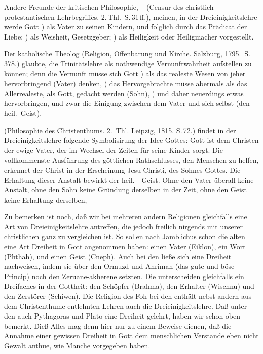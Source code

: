 \begin{aufza}
\begin{aufzb}
\item Andere Freunde der kritischen Philosophie, \zB\  (Censur des christlich-protestantischen Lehrbegriffes, 2.\,Thl.\ S.\,31\,ff.), meinen, in der Dreieinigkeitslehre werde Gott ) als Vater zu seinen Kindern, und folglich durch das Prädicat der Liebe; ) als Weisheit, Gesetzgeber; ) als Heiligkeit oder Heiligmacher vorgestellt.
\item Der katholische Theolog  (Religion, Offenbarung und Kirche. Salzburg, 1795.\ S.\,378.) glaubte, die Trinitätslehre als nothwendige Vernunftwahrheit aufstellen zu können; denn die Vernunft müsse sich Gott ) als das realeste Wesen von jeher hervorbringend (Vater) denken, ) das Hervorgebrachte müsse abermals als das Allerrealeste, als Gott, gedacht werden (Sohn), ) und daher neuerdings etwas hervorbringen, und zwar die Einigung zwischen dem Vater und sich selbst (den heil.\ Geist).
\item {} (Philosophie des Christenthums. 2.~Thl. Leipzig, 1815. S.\,72.) findet in der Dreieinigkeitslehre folgende Symbolisirung der Idee Gottes: Gott ist dem Christen der ewige Vater, der im Wechsel der Zeiten für seine Kinder sorgt. Die vollkommenste Ausführung des göttlichen Rathschlusses, den Menschen zu helfen, erkennet der Christ in der Erscheinung Jesu Christi, des Sohnes Gottes. Die Erhaltung dieser Anstalt bewirkt der heil.~\ Geist. Ohne den Vater überall keine Anstalt, ohne den Sohn keine Gründung derselben in der Zeit, ohne den Geist keine Erhaltung derselben, \usw\
\end{aufzb}
\end{aufza}

\begin{RWanm} 
Zu bemerken ist noch, daß wir bei mehreren andern Religionen gleichfalls eine Art von Dreieinigkeitslehre antreffen, die jedoch freilich nirgends mit unserer christlichen ganz zu vergleichen ist. So sollen nach Jamblichus schon die alten  eine Art Dreiheit in Gott angenommen haben: einen Vater (Eiklon), ein Wort (Phthah), und einen Geist (Cneph). Auch bei den  ließe sich eine Dreiheit nachweisen, indem sie über den Ormuzd und Ahriman (das gute und böse Princip) noch den Zeruane-akherene setzten. Die  unterscheiden gleichfalls ein Dreifaches in der Gottheit: den Schöpfer (Brahma), den Erhalter (Wischnu) und den Zerstörer (Schiwen). Die Religion des Foh bei den  enthält nebst andern aus dem Christenthume entlehnten Lehren auch die Dreieinigkeitslehre. Daß unter den  auch Pythagoras und Plato eine Dreiheit gelehrt, haben wir schon oben bemerkt. Dieß Alles mag denn hier nur zu einem Beweise dienen, daß die Annahme einer gewissen Dreiheit in Gott dem menschlichen Verstande eben nicht Gewalt anthue, wie Manche vorgegeben haben. \end{RWanm}

